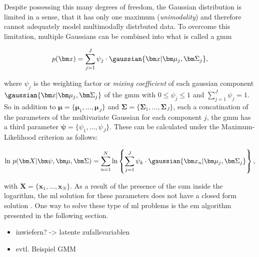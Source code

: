Despite possessing this many degrees of freedom, the Gaussian distribution is limited in a sense, that it has only one maximum (\textit{unimodality}) and therefore cannot adequately model multimodally distrbuted data. To overcome this limitation, multiple Gaussians can be combined into what is called a \acrlong{gmm}

\begin{equation}
	p(\bm x)=\sum^J_{j=1}\psi_j\cdot\gaussian{\bm x\vert\bm\mu_j,\bm\Sigma_j},
\end{equation}

where $\psi_j$ is the weighting factor or \textit{mixing coefficient} of each gaussian component $\gaussian{\bm x\vert\bm\mu_j,\bm\Sigma_j}$ of the \gls{gmm} with $0\leq\psi_j\leq 1$ and $\sum_{j=1}^J \psi_j=1$. So in addition to $\bm\mu=\{\bm\mu_1,\dots,\bm\mu_J\}$ and $\bm\Sigma=\{\bm\Sigma_1,\dots,\bm\Sigma_J\}$, each a concatination of the parameters of the multivariate Gaussian for each component $j$, the \gls{gmm} has a third parameter $\bm\psi=\{\psi_1,\dots,\psi_J\}$. These can be calculated under the Maximum-Likelihood criterion as follows:

\begin{equation}
	\text{ln}\ p(\bm X\vert\bm\psi,\bm\mu,\bm\Sigma)=\sum_{n=1}^N \text{ln}\left\{\sum_{j=1}^J \psi_k\cdot\gaussian{\bm x_n\vert\bm\mu_j,\bm\Sigma_j} \right\},
\end{equation}

with $\bm X=\{\bm x_1,\dots,\bm x_N\}$. As a result of the presence of the sum inside the logarithm, the \gls{ml} solution for these parameters does not have a closed form solution \cite[p.113]{Bishop2006}. One way to solve these type of \gls{ml} problems is the \gls{em} algorithm presented in the following section.

\begin{itemize}
    \item inwiefern? -> latente zufallsvariablen
    \item evtl. Beispiel GMM
\end{itemize}

